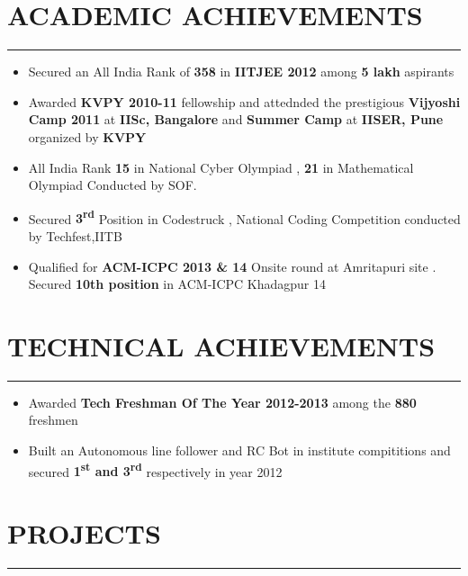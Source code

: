\documentclass[11pt]{article} %
\begin{document}
\section*{ACADEMIC ACHIEVEMENTS}
\vspace{-2mm}
\hrule
\medskip
\begin{itemize}
\itemsep-0.3em
\item Secured an All India Rank of {\bf 358} in {\bf IITJEE 2012} among {\bf 5 lakh} aspirants
\item Awarded {\bf KVPY 2010-11} fellowship and  attednded the prestigious {\bf Vijyoshi Camp 2011} at {\bf IISc, Bangalore} and {\bf Summer 
Camp} at {\bf IISER, Pune} organized by {\bf KVPY}
\item All India Rank {\bf 15} in National Cyber Olympiad , {\bf 21} in Mathematical Olympiad Conducted by SOF.
\item Secured {\bf 3\textsuperscript{rd}} Position in Codestruck , National Coding Competition conducted by Techfest,IITB
\item Qualified for \textbf{ACM-ICPC 2013 \& 14} Onsite round at Amritapuri site . Secured \textbf{10th position} in ACM-ICPC Khadagpur 14
\end{itemize}
\vspace{-7mm}

\section*{TECHNICAL ACHIEVEMENTS}
\vspace{-2mm}
\hrule
\medskip

\begin{itemize}
\itemsep-0.3em
\item Awarded {\bf Tech Freshman Of The Year 2012-2013} among the {\bf 880} freshmen
\item Built an Autonomous line follower and RC Bot in institute compititions and secured {\bf 1\textsuperscript{st} and 3\textsuperscript{rd} } respectively in year 2012
\end{itemize}
\vspace{-7mm}

\section*{PROJECTS}
\vspace{-3mm}
\hrule
\medskip
\end{document}
